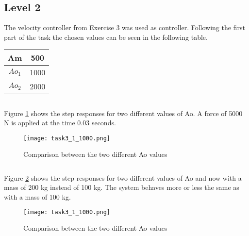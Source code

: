 %
%
%
%
%

\subsection*{Level 2}
The velocity controller from Exercise 3 was used as controller. Following the first part of the task the chosen values can be seen in the following table.

\begin{center}

	\begin{tabular}{| c | c |}
		\hline
		Am & 500 \\ \hline
		$Ao_1$ & 1000 \\ \hline
		$Ao_2$ & 2000 \\
		\hline
		

	\end{tabular}

\end{center}

\subsection{}
Figure \ref{fig:task3_1_1000} shows the step responses for two different values of Ao. A force of 5000 N is applied at the time 0.03 seconds.
\begin{figure}[H]
	\begin{center}
	
		\texttt{[image: task3\_1\_1000.png]}
		\caption{Comparison between the two different Ao values}
		\label{fig:task3_1_1000}
	\end{center}
\end{figure}

\subsection{}
Figure \ref{fig:task3_2_1000} shows the step responses for two different values of Ao and now with a mass of 200 kg instead of 100 kg. The system behaves more or less the same as with a mass of 100 kg.
\begin{figure}[H]
	\begin{center}
	
		\texttt{[image: task3\_1\_1000.png]}
		\caption{Comparison between the two different Ao values}
		\label{fig:task3_2_1000}
	\end{center}
\end{figure}

